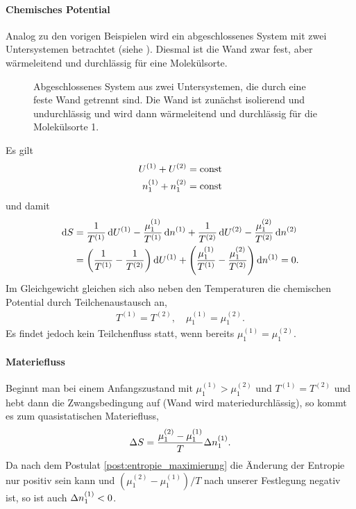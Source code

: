\paragraph*{Chemisches Potential}

Analog zu den vorigen Beispielen wird ein abgeschlossenes System mit zwei Untersystemen betrachtet (siehe ). Diesmal ist die Wand zwar fest, aber wärmeleitend und durchlässig für eine Molekülsorte.

\begin{figure}[htbp]
    \centering
    \tfigDoppelsystemUVNbeweglicheIsolierendeWand
    \caption{Abgeschlossenes System aus zwei Untersystemen, die durch eine feste Wand getrennt sind. Die Wand ist zunächst isolierend und undurchlässig und wird dann wärmeleitend und durchlässig für die Molekülsorte 1.}
    \label{fig:DoppelsystemUVNbeweglicheIsolierendeWand}
\end{figure}

Es gilt
\begin{align*}
    U^{(1)} + U^{(2)}         & = \mathrm{const} \\
    n_1^{(1)} + n_1^{(2)} & = \mathrm{const}
\end{align*}
und damit
\begin{align*}
    \mathop{}\!\mathrm{d} S & = \frac{1}{T^{(1)}}\mathop{}\!\mathrm{d} U^{(1)} - \frac{\mu_1^{(1)}}{T^{(1)}}\mathop{}\!\mathrm{d} n^{(1)}+\frac{1}{T^{(2)}}\mathop{}\!\mathrm{d} U^{(2)} - \frac{\mu_1^{(2)}}{T^{(2)}}\mathop{}\!\mathrm{d} n^{(2)}   \\
            & = \left(\frac{1}{T^{(1)}}-\frac{1}{T^{(2)}}\right)\mathop{}\!\mathrm{d} U^{(1)} + \left(\frac{\mu_1^{(1)}}{T^{(1)}}-\frac{\mu_1^{(2)}}{T^{(2)}}\right) \mathop{}\!\mathrm{d} n^{(1)} = 0.
\end{align*}
Im Gleichgewicht gleichen sich also neben den Temperaturen die chemischen Potential durch Teilchenaustausch an,
\begin{align*}
    T^{(1)} = T^{(2)}, \quad \mu_1^{(1)} = \mu_1^{(2)}.
\end{align*}
Es findet jedoch kein Teilchenfluss statt, wenn bereits $\mu_1^{(1)} = \mu_1^{(2)}$.

\paragraph*{Materiefluss}

Beginnt man bei einem Anfangszustand mit $\mu_1^{(1)} > \mu_1^{(2)}$ und $T^{(1)} = T^{(2)}$ und hebt dann die Zwangsbedingung auf (Wand wird materiedurchlässig), so kommt es zum quasistatischen Materiefluss,
\begin{align*}
    \Delta S = \frac{\mu_1^{(2)} - \mu_1^{(1)}}{T} \Delta n_1^{(1)}.
\end{align*}
Da nach dem Postulat \ref{post:entropie_maximierung} die Änderung der Entropie nur positiv sein kann und $(\mu_1^{(2)} - \mu_1^{(1)})/T$ nach unserer Festlegung negativ ist, so ist auch $\Delta n_1^{(1)}<0$.

